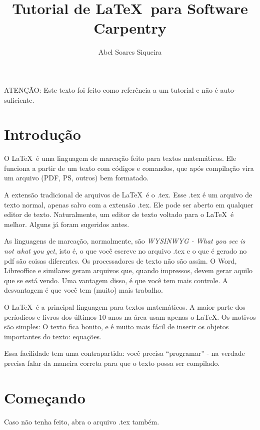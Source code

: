 \documentclass{article}
\author{Abel Soares Siqueira}
\title{Tutorial de \LaTeX\ para Software Carpentry}
\date{}
\begin{document}
\maketitle

\begin{center}
  \bf
\begin{minipage}{0.7\textwidth}
ATENÇÃO: Este texto foi feito como referência a um tutorial e não é
auto-suficiente.
\end{minipage}
\end{center}

\section{Introdução}

O \LaTeX\ é uma linguagem de marcação feito para textos matemáticos.
Ele funciona a partir de um texto com códigos e comandos, que após
compilação vira um arquivo (PDF, PS, outros) bem formatado.

A extensão tradicional de arquivos de \LaTeX\ é o .tex. Esse .tex é um
arquivo de texto normal, apenas salvo com a extensão .tex. Ele pode ser
aberto em qualquer editor de texto.
Naturalmente, um editor de texto voltado para o \LaTeX\ é melhor.
Alguns já foram sugeridos antes.

As linguagens de marcação, normalmente, são \emph{WYSINWYG - What you
see is not what you get}, isto é, o que você escreve no arquivo .tex e
o que é gerado no pdf são coisas diferentes.
Os processadores de texto não são assim. O Word, Libreoffice e
similares geram arquivos que, quando impressos, devem gerar aquilo que
se está vendo.
Uma vantagem disso, é que você tem mais controle. A desvantagem é que
você tem (muito) mais trabalho.

O \LaTeX\ é a principal linguagem para textos matemáticos. A maior
parte dos períodicos e livros dos últimos 10 anos na área usam apenas o
\LaTeX. Os motivos são simples: O texto fica bonito, e é muito mais
fácil de inserir os objetos importantes do texto: equações.

Essa facilidade tem uma contrapartida: você precisa ``programar'' - na
verdade precisa falar da maneira correta para que o texto possa ser
compilado.

\section{Começando}

Caso não tenha feito, abra o arquivo .tex também.
\end{document}
